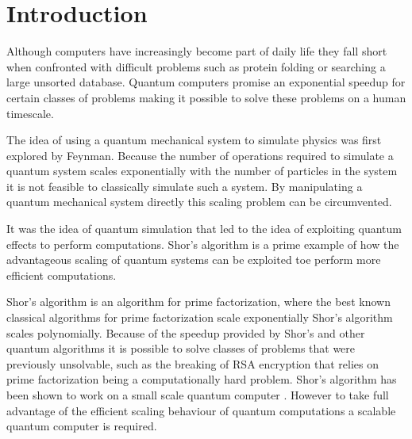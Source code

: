\chapter{Introduction}
Although computers have increasingly become part of daily life they fall short when confronted with difficult problems  such as protein folding or searching a large unsorted database.
Quantum computers promise an exponential speedup for certain classes of problems making it possible to solve these problems on a human timescale.

The idea of using a quantum mechanical system to simulate physics was first explored by Feynman\cite{Feynman1982Simulating}.
Because the number of operations required to simulate a quantum system scales exponentially with the number of particles in the system it is not feasible to classically simulate such a system.
By manipulating a quantum mechanical system directly this scaling problem can be circumvented.

It was the idea of quantum simulation that led to the idea of exploiting quantum effects to perform computations.
Shor's algorithm \citep{Shor1994Algorithms} is a prime example of how the advantageous scaling of quantum systems can be exploited toe perform more efficient computations.

Shor's algorithm is an algorithm for prime factorization, where the best known classical algorithms for prime factorization scale exponentially Shor's algorithm scales polynomially.
Because of  the speedup provided by Shor's and other quantum algorithms it is possible to solve classes of problems that were previously unsolvable, such as the breaking of RSA encryption that relies on prime factorization being a computationally hard problem.
Shor's algorithm has been shown to work on a small scale quantum computer \cite{Vandersypen2001Experimental}.
However to take full advantage of the efficient scaling behaviour of quantum computations a scalable quantum computer is required.


